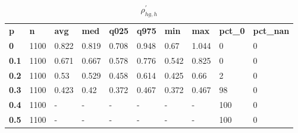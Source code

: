 \begin{table}[h]
 \centering 
\footnotesize
\caption{$\rho_{hg,h}^\prime $}
\label{tab:alphahgh}
\begin{tabular}[h]{| l l l l l l l l l l|
    } \hline
\textbf{ p} & \textbf{ n} & \textbf{ avg} & \textbf{ med} & \textbf{ q025} & \textbf{ q975} & \textbf{ min} & \textbf{ max} & \textbf{ pct\_0} & \textbf{ pct\_nan}
           \\
  \textbf{  0} & 1100 & 0.822 & 0.819 & 0.708 & 0.948 &  0.67 & 1.044 &   0 & 0
           \\
  \textbf{0.1} & 1100 & 0.671 & 0.667 & 0.578 & 0.776 & 0.542 & 0.825 &   0 & 0
           \\
  \textbf{0.2} & 1100 &  0.53 & 0.529 & 0.458 & 0.614 & 0.425 &  0.66 &   2 & 0
           \\
  \textbf{0.3} & 1100 & 0.423 &  0.42 & 0.372 & 0.467 & 0.372 & 0.467 &  98 & 0
           \\
  \textbf{0.4} & 1100 & - & - & - & - & - & - & 100 & 0
           \\
  \textbf{0.5} & 1100 & - & - & - & - & - & - & 100 & 0
           \\
 \hline \end{tabular}
 \end{table}
